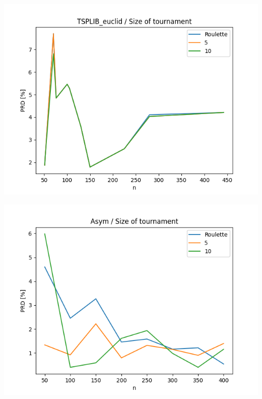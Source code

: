 \documentclass{article}
\begin{document}
\begin{center}
\includegraphics[width=\textwidth, 
                   height = 0.4\textheight, 
                   keepaspectratio]
                  {plots/tsplib_euclid_7_tour} 
\end{center}

\begin{center}
\includegraphics[width=\textwidth, 
                   height = 0.4\textheight, 
                   keepaspectratio]
                  {plots/asym_7_tour} 
\end{center}
\end{document}
